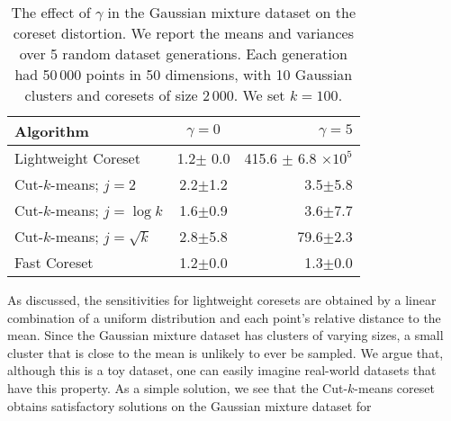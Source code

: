 \begin{table}[htbp]
    \label{tbl:class-imbalance}
    \centering
    \begin{tabular}{lcr}
        Algorithm & $\gamma = 0$ & $\gamma = 5$ \\
        \hline
        Lightweight Coreset & 1.2$\pm$ 0.0 & 415.6 $\pm$ 6.8 $\times 10^5$ \\
        Cut-$k$-means; $j=2$ & 2.2$\pm$1.2 & 3.5$\pm$5.8 \\
        Cut-$k$-means; $j=\log k$ & 1.6$\pm$0.9 & 3.6$\pm$7.7 \\
        Cut-$k$-means; $j=\sqrt{k}$ & 2.8$\pm$5.8 & 79.6$\pm$2.3 \\
        Fast Coreset & 1.2$\pm$0.0 & 1.3$\pm$0.0
    \end{tabular}
    \caption{The effect of $\gamma$ in the Gaussian mixture dataset on the coreset distortion. We report the means and variances over 5 random dataset generations.
    Each generation had 50\,000 points in 50 dimensions, with 10 Gaussian clusters and coresets of size 2\,000. We set $k=100$.}
\end{table}

As discussed, the sensitivities for lightweight coresets are obtained by a linear combination of a uniform distribution and each point's relative
distance to the mean. Since the Gaussian mixture dataset has clusters of varying sizes, a small cluster that is close to the mean is unlikely
to ever be sampled. We argue that, although this is a toy dataset, one can easily imagine real-world datasets that have this property. 
As a simple solution, we see that the Cut-$k$-means coreset obtains satisfactory solutions on the Gaussian mixture dataset for 

